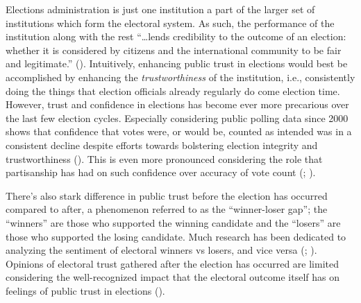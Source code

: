 \documentclass[
  12pt,
  letterpaper,
]{article}
\begin{document}
Elections administration is just one institution a part of the larger
set of institutions which form the electoral system. As such, the
performance of the institution along with the rest ``\ldots lends
credibility to the outcome of an election: whether it is considered by
citizens and the international community to be fair and legitimate.''
(). Intuitively, enhancing
public trust in elections would best be accomplished by enhancing the
\emph{trustworthiness} of the institution, i.e., consistently doing the
things that election officials already regularly do come election time.
However, trust and confidence in elections has become ever more
precarious over the last few election cycles. Especially considering
public polling data since 2000 shows that confidence that votes were, or
would be, counted as intended was in a consistent decline despite
efforts towards bolstering election integrity and trustworthiness
(). This is even more
pronounced considering the role that partisanship has had on such
confidence over accuracy of vote count (; ).

There's also stark difference in public trust before the election has
occurred compared to after, a phenomenon referred to as the
``winner-loser gap''; the ``winners'' are those who supported the
winning candidate and the ``losers'' are those who supported the losing
candidate. Much research has been dedicated to analyzing the sentiment
of electoral winners vs losers, and vice versa
(;
). Opinions of electoral
trust gathered after the election has occurred are limited considering
the well-recognized impact that the electoral outcome itself has on
feelings of public trust in elections
().
\end{document}

